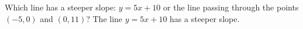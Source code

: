 {Which line has a steeper slope: $y=5x+10$ or the line passing through the points $(-5,0)$ and $(0,11)$?}
{The line $y=5x+10$ has a steeper slope.}
